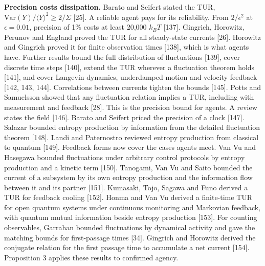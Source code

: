 \documentclass[
  10pt,
]{article}
\begin{document}
\textbf{Precision costs dissipation.} Barato and Seifert stated the TUR,
\(\mathrm{Var}(Y)/\langle Y\rangle^2 \ge 2/\Sigma\) {[}25{]}. A reliable
agent pays for its reliability. From \(2/\epsilon^2\) at
\(\epsilon = 0.01\), precision of 1\% costs at least 20,000 \(k_B T\)
{[}137{]}. Gingrich, Horowitz, Perunov and England proved the TUR for
all steady-state currents {[}26{]}. Horowitz and Gingrich proved it for
finite observation times {[}138{]}, which is what agents have. Further
results bound the full distribution of fluctuations {[}139{]}, cover
discrete time steps {[}140{]}, extend the TUR wherever a fluctuation
theorem holds {[}141{]}, and cover Langevin dynamics, underdamped motion
and velocity feedback {[}142, 143, 144{]}. Correlations between currents
tighten the bounds {[}145{]}. Potts and Samuelsson showed that any
fluctuation relation implies a TUR, including with measurement and
feedback {[}28{]}. This is the precision bound for agents. A review
states the field {[}146{]}. Barato and Seifert priced the precision of a
clock {[}147{]}. Salazar bounded entropy production by information from
the detailed fluctuation theorem {[}148{]}. Landi and Paternostro
reviewed entropy production from classical to quantum {[}149{]}.
Feedback forms now cover the cases agents meet. Van Vu and Hasegawa
bounded fluctuations under arbitrary control protocols by entropy
production and a kinetic term {[}150{]}. Tanogami, Van Vu and Saito
bounded the current of a subsystem by its own entropy production and the
information flow between it and its partner {[}151{]}. Kumasaki, Tojo,
Sagawa and Funo derived a TUR for feedback cooling {[}152{]}. Honma and
Van Vu derived a finite-time TUR for open quantum systems under
continuous monitoring and Markovian feedback, with quantum mutual
information beside entropy production {[}153{]}. For counting
observables, Garrahan bounded fluctuations by dynamical activity and
gave the matching bounds for first-passage times {[}34{]}. Gingrich and
Horowitz derived the conjugate relation for the first passage time to
accumulate a net current {[}154{]}. Proposition 3 applies these results
to confirmed agency.
\end{document}
